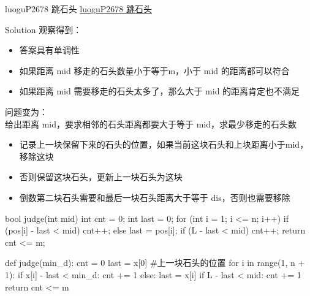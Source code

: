 \documentclass[aspectratio=169,xcolor=dvipsnames]{beamer}
\begin{document}
\begin{frame}{luoguP2678 跳石头}
    \href{https://www.luogu.com.cn/problem/P2678}{luoguP2678 跳石头}
\end{frame}


\begin{frame}{Solution}
    观察得到：
    \begin{itemize}
        \item 答案具有单调性
        \item 如果距离 mid 移走的石头数量小于等于m，小于 mid 的距离都可以符合
        \item 如果距离 mid 需要移走的石头太多了，那么大于 mid 的距离肯定也不满足
    \end{itemize}
    问题变为：\\
    给出距离 mid，要求相邻的石头距离都要大于等于 mid，求最少移走的石头数\\
    \begin{itemize}
        \item 记录上一块保留下来的石头的位置，如果当前这块石头和上块距离小于mid，移除这块
        \item 否则保留这块石头，更新上一块石头为这块
        \item 倒数第二块石头需要和最后一块石头距离大于等于 dis，否则也需要移除
    \end{itemize}
\end{frame}
\begin{minipage}{0.45\textwidth}
    \centering
    \begin{cppcode}
bool judge(int mid) {
    int cnt = 0;
    int last = 0;
    for (int i = 1; i <= n; i++) {
        if (pos[i] - last < mid)
            cnt++;
        else
            last = pos[i];
    }
    if (L - last < mid) cnt++;
    return cnt <= m;
}
    \end{cppcode}
\end{minipage}%
\hfill
\begin{minipage}{0.45\textwidth}
    \centering
    \begin{pycode}
def judge(min_d):
    cnt = 0
    last = x[0]  #上一块石头的位置
    for i in range(1, n + 1):
        if x[i] - last < min_d:
            cnt += 1
        else:
            last = x[i]
    if L - last < mid:
        cnt += 1
    return cnt <= m
    \end{pycode}
\end{minipage}
\end{document}

